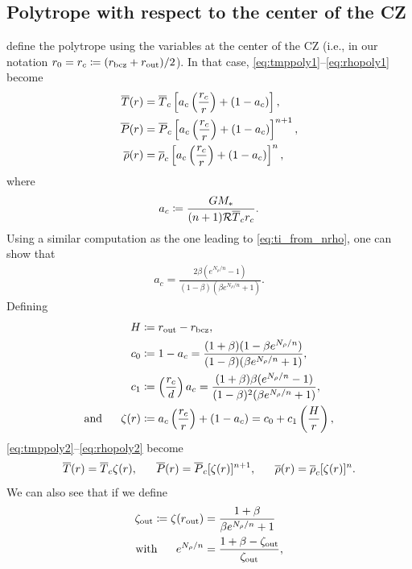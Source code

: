 \documentclass[12pt]{article}
\numberwithin{equation}{section}
\newcommand{\nrho}{N_\rho}
\begin{document}
\subsection{Polytrope with respect to the center of the CZ}
\citet{Jones2011} define the polytrope using the variables at the center of the CZ (i.e., in our notation $r_0=r_c\coloneqq(r_{\rm{bcz}}+r_{\rm{out}})/2$). In that case, \eqref{eq:tmppoly1}--\eqref{eq:rhopoly1} become
\begin{align}
	\overline{T}(r) &= \overline{T}_c\left[a_c\left(\frac{r_c}{r}\right) + (1 - a_c)\right],\label{eq:tmppoly2}\\
	\overline{P}(r) &= \overline{P}_c\left[a_c\left(\frac{r_c}{r}\right) + (1 - a_c)\right]^{n+1},\label{eq:ppoly2}\\
	\overline{\rho}(r) &= \overline{\rho}_c\left[a_c\left(\frac{r_c}{r}\right) + (1 - a_c)\right]^n,\label{eq:rhopoly2}
\end{align} 
where 
\begin{align}
a_c \coloneqq \frac{GM_*}{(n+1)\mathcal{R} \overline{T}_c r_c}.
\label{eq:ac}
\end{align}
Using a similar computation as the one leading to \eqref{eq:ti_from_nrho}, one can show that 
\begin{align}
a_c = \frac{2\beta(e^{\nrho/n}-1)}{(1-\beta)(\beta e^{\nrho/n} + 1)}.
\label{eq:ac_fromn}
\end{align}
Defining 
\begin{align}
H&\define r\out-r\bcz,\label{eq:d}\\
c_0&\define 1-a_c = \frac{(1+\beta)(1-\beta e^{\nrho/n})}{(1-\beta)(\beta e^{\nrho/n} + 1)}, \label{eq:c0}\\
c_1&\define \left(\frac{r_c}{d}\right)a_c = \frac{(1+\beta)\beta(e^{\nrho/n}-1)}{(1-\beta)^2(\beta e^{\nrho/n} + 1)},\label{eq:c1}\\
\andd \zeta(r) &\define a_c\left(\frac{r_c}{r}\right) + (1-a_c) = c_0 + c_1\left(\frac{H}{r}\right),\label{eq:zeta}
\end{align}
\eqref{eq:tmppoly2}--\eqref{eq:rhopoly2} become
\begin{align}
\tmpref\ofr=\tmpref_c\zeta(r),\ \ \ \ \ \prsref\ofr=\prsref_c[\zeta(r)]^{n+1},\ \ \ \ \ \rhoref\ofr=\rhoref_c[\zeta(r)]^n. 
\label{eq:polytrope3}
\end{align}
We can also see that if we define
\begin{subequations}
\begin{align}
\zeta\out \define \zeta(r\out) &= \frac{1+\beta}{\beta e^{\nrho/n} + 1}\\
\with e^{\nrho/n}&=\frac{1+\beta-\zeta\out}{\zeta\out},
\end{align}
\end{subequations}
\end{document}

